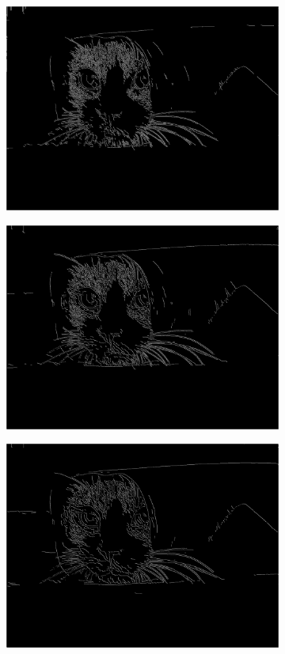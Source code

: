 \documentclass[a4paper]{article}
\begin{document}
\begin{figure}[h]
\begin{subfigure}{0.33\textwidth}
\includegraphics[width=\textwidth]{img/sigma1/cathys0.png}
\end{subfigure}
\begin{subfigure}{0.33\textwidth}
\includegraphics[width=\textwidth]{img/sigma2/cathys0.png}
\end{subfigure}
\begin{subfigure}{0.33\textwidth}
\includegraphics[width=\textwidth]{img/sigma3/cathys0.png}

\end{subfigure}
\end{figure}
\end{document}
